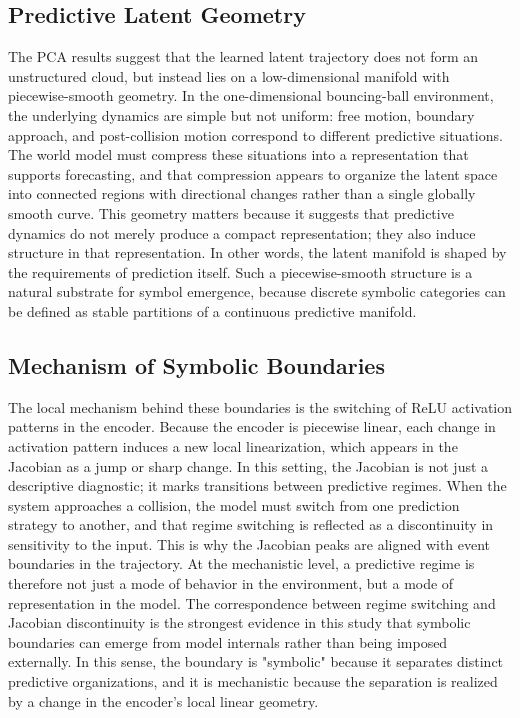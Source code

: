 \documentclass[11pt]{article}
\begin{document}
\subsection{Predictive Latent Geometry}
The PCA results suggest that the learned latent trajectory does not form an unstructured cloud, but instead lies on a low-dimensional manifold with piecewise-smooth geometry. In the one-dimensional bouncing-ball environment, the underlying dynamics are simple but not uniform: free motion, boundary approach, and post-collision motion correspond to different predictive situations. The world model must compress these situations into a representation that supports forecasting, and that compression appears to organize the latent space into connected regions with directional changes rather than a single globally smooth curve. This geometry matters because it suggests that predictive dynamics do not merely produce a compact representation; they also induce structure in that representation. In other words, the latent manifold is shaped by the requirements of prediction itself. Such a piecewise-smooth structure is a natural substrate for symbol emergence, because discrete symbolic categories can be defined as stable partitions of a continuous predictive manifold.

\subsection{Mechanism of Symbolic Boundaries}
The local mechanism behind these boundaries is the switching of ReLU activation patterns in the encoder. Because the encoder is piecewise linear, each change in activation pattern induces a new local linearization, which appears in the Jacobian as a jump or sharp change. In this setting, the Jacobian is not just a descriptive diagnostic; it marks transitions between predictive regimes. When the system approaches a collision, the model must switch from one prediction strategy to another, and that regime switching is reflected as a discontinuity in sensitivity to the input. This is why the Jacobian peaks are aligned with event boundaries in the trajectory. At the mechanistic level, a predictive regime is therefore not just a mode of behavior in the environment, but a mode of representation in the model. The correspondence between regime switching and Jacobian discontinuity is the strongest evidence in this study that symbolic boundaries can emerge from model internals rather than being imposed externally. In this sense, the boundary is "symbolic" because it separates distinct predictive organizations, and it is mechanistic because the separation is realized by a change in the encoder's local linear geometry.
\end{document}
